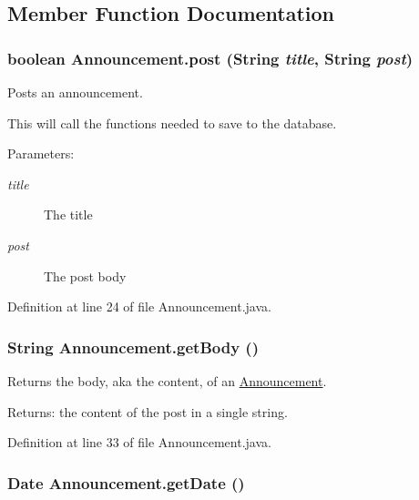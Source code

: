 \subsection{Member Function Documentation}
\hypertarget{classAnnouncement_f7a63ab0943725b670109306ae520c34}{
\subsubsection{\setlength{\rightskip}{0pt plus 5cm}boolean Announcement.post (String {\em title}, \/  String {\em post})}}
\label{classAnnouncement_f7a63ab0943725b670109306ae520c34}


Posts an announcement. 

This will call the functions needed to save to the database. \begin{Desc}
\item[Parameters:]
\begin{description}
\item[{\em title}]The title \item[{\em post}]The post body \end{description}
\end{Desc}


Definition at line 24 of file Announcement.java.\hypertarget{classAnnouncement_af0e521a6b1fc8dacf7bfae6ae742d47}{
\subsubsection{\setlength{\rightskip}{0pt plus 5cm}String Announcement.getBody ()}}
\label{classAnnouncement_af0e521a6b1fc8dacf7bfae6ae742d47}


Returns the body, aka the content, of an \hyperlink{classAnnouncement}{Announcement}. 

\begin{Desc}
\item[Returns:]the content of the post in a single string. \end{Desc}


Definition at line 33 of file Announcement.java.\hypertarget{classAnnouncement_171773283804e5dedeaab914c2652379}{
\subsubsection{\setlength{\rightskip}{0pt plus 5cm}Date Announcement.getDate ()}}
\label{classAnnouncement_171773283804e5dedeaab914c2652379}


